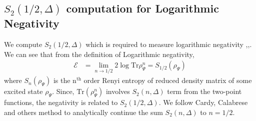 \documentclass[11pt]{article}
\begin{document}
\subsection{\texorpdfstring{$S_2(1/2,\Delta)$ computation for Logarithmic Negativity}{S2 (1/2) for logarithmic negativity}}
We compute $S_2(1/2,\Delta)$ which is required to measure logarithmic negativity \cite{Vidal_2002},\cite{Calabrese_2012},\cite{Calabrese_2013}. We can see that from the definition of Logarithmic negativity,
\begin{align}
    \mathcal{E} &= \lim_{n\to 1/2}2\log \text{Tr} \rho_\Psi^n = S_{1/2}(\rho_\Psi)
\end{align}
where $S_n(\rho_\Psi)$ is the $\text{n}^{\text{th}}$ order Renyi entropy of reduced density matrix of some excited state $\rho_\Psi$. 
Since, $\text{Tr}(\rho_\Psi^n)$ involves $S_2(n,\Delta)$ term from the two-point functions, the negativity is related to $S_2(1/2,\Delta)$. 
We follow Cardy, Calabrese and others
\cite{calabrese2011entanglement} method to analytically continue the sum $S_2(n,\Delta)$ to $n = 1/2$. 
\end{document}
